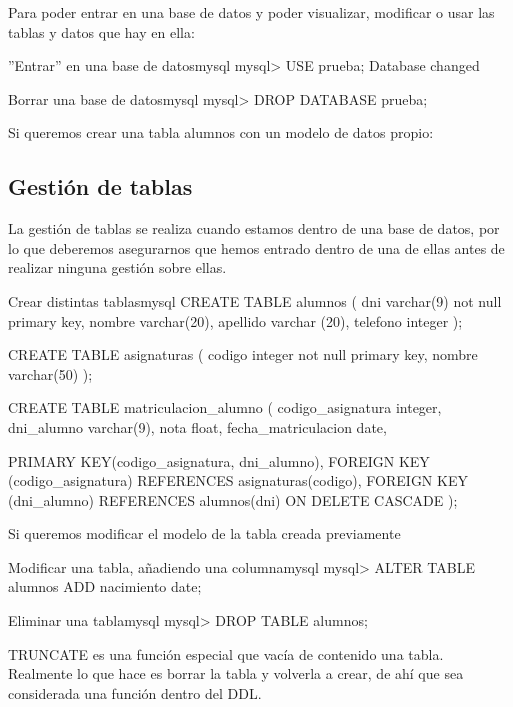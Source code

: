 Para poder entrar en una base de datos y poder visualizar, modificar o usar las tablas y datos que hay en ella:

\begin{mycode}{”Entrar” en una base de datos}{mysql}{}
mysql> USE prueba;
Database changed
\end{mycode}

\begin{mycode}{Borrar una base de datos}{mysql}{}
mysql> DROP DATABASE prueba;
\end{mycode}


Si queremos crear una tabla alumnos con un modelo de datos propio:
\subsection{Gestión de tablas}
La gestión de tablas se realiza cuando estamos dentro de una base de datos, por lo que deberemos asegurarnos que hemos entrado dentro de una de ellas antes de realizar ninguna gestión sobre ellas.



\begin{mycode}{Crear distintas tablas}{mysql}{}
CREATE TABLE alumnos (
    dni      varchar(9) not null primary key,
    nombre   varchar(20),
    apellido varchar (20),
    telefono integer
);

CREATE TABLE asignaturas (
    codigo integer not null primary key,
    nombre varchar(50)
);

CREATE TABLE matriculacion_alumno (
codigo_asignatura integer,
dni_alumno varchar(9),
nota float,
fecha_matriculacion date,

PRIMARY KEY(codigo_asignatura, dni_alumno),
FOREIGN KEY (codigo_asignatura) REFERENCES asignaturas(codigo),
FOREIGN KEY (dni_alumno) REFERENCES alumnos(dni) ON DELETE CASCADE
);
\end{mycode}

Si queremos modificar el modelo de la tabla creada previamente

\begin{mycode}{Modificar una tabla, añadiendo una columna}{mysql}{}
mysql> ALTER TABLE alumnos ADD nacimiento date;
\end{mycode}


\begin{mycode}{Eliminar una tabla}{mysql}{}
mysql> DROP TABLE alumnos;
\end{mycode}

TRUNCATE es una función especial que vacía de contenido una tabla. Realmente lo que hace es borrar la tabla y volverla a crear, de ahí que sea considerada una función dentro del DDL.

